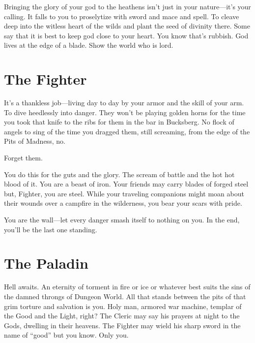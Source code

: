          

Bringing the glory of your god to the heathens isn't just in your nature—it's your calling. It falls to you to proselytize with sword and mace and spell. To cleave deep into the witless heart of the wilds and plant the seed of divinity there. Some say that it is best to keep god close to your heart. You know that’s rubbish. God lives at the edge of a blade. Show the world who is lord.

         
\section{The Fighter}   
         

It’s a thankless job—living day to day by your armor and the skill of your arm. To dive heedlessly into danger. They won’t be playing golden horns for the time you took that knife to the ribs for them in the bar in Bucksberg. No flock of angels to sing of the time you dragged them, still screaming, from the edge of the Pits of Madness, no.

         

Forget them.

         

You do this for the guts and the glory. The scream of battle and the hot hot blood of it. You are a beast of iron. Your friends may carry blades of forged steel but, Fighter, you are steel. While your traveling companions might moan about their wounds over a campfire in the wilderness, you bear your scars with pride.

         

You are the wall—let every danger smash itself to nothing on you. In the end, you’ll be the last one standing.

         
\section{The Paladin}   
         

Hell awaits. An eternity of torment in fire or ice or whatever best suits the sins of the damned throngs of Dungeon World. All that stands between the pits of that grim torture and salvation is you. Holy man, armored war machine, templar of the Good and the Light, right? The Cleric may say his prayers at night to the Gods, dwelling in their heavens. The Fighter may wield his sharp sword in the name of “good” but you know. Only you.

